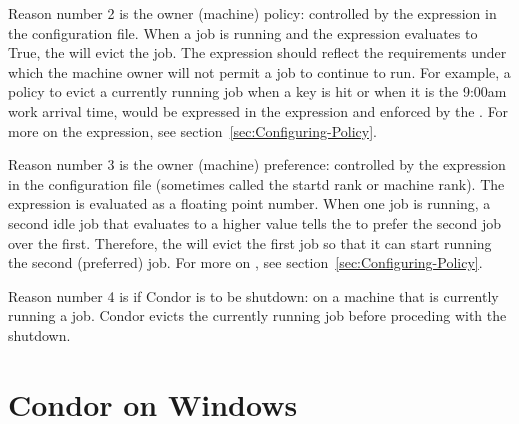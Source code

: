 \begin{description}
Reason number 2 is the owner (machine) policy:
controlled by the  expression in the configuration file.
When a job is running and the  expression
evaluates to True,
the  will evict the job.
The  expression should reflect 
the requirements under which the machine owner will not permit
a job to continue to run.
For example, a policy to evict a currently running job when a key is hit
or when it is the 9:00am work arrival time,
would be expressed in the  expression 
and enforced by the .
For more on the  expression,
see section~\ref{sec:Configuring-Policy}.

Reason number 3 is the owner (machine) preference:
controlled by the  expression in the 
configuration file (sometimes called the startd rank or machine rank).
The  expression is evaluated as a floating point number.
When one job is running, a second idle job that evaluates to a higher
 value 
tells the  to prefer the second job over the first.
Therefore, the  will evict the first 
job so that it can start running the second (preferred) job.
For more on ,
see section~\ref{sec:Configuring-Policy}.

Reason number 4 is if Condor is to be shutdown:
on a machine that is currently running a job.
Condor evicts the currently running job before proceding
with the shutdown.
\end{description}

\section{Condor on Windows}

